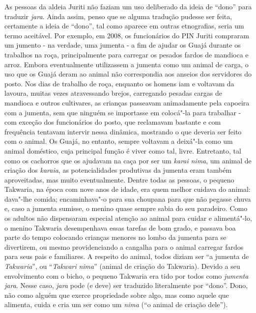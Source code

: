 As pessoas da aldeia Juriti não faziam um uso deliberado da ideia de
``dono'' para traduzir \emph{jara}. Ainda assim, penso que se alguma
tradução pudesse ser feita, certamente a ideia de ``dono'', tal como
aparece em outras etnografias, seria um termo aceitável. Por exemplo, em
2008, os funcionários do PIN Juriti compraram um jumento - na verdade,
uma jumenta - a fim de ajudar os Guajá durante os trabalhos na roça,
principalmente para carregar os pesados fardos de mandioca e arroz.
Embora eventualmente utilizassem a jumenta como um animal de carga, o
uso que os Guajá deram ao animal não correspondia aos anseios dos
servidores do posto. Nos dias de trabalho de roça, enquanto os homens
iam e voltavam da lavoura, muitas vezes atravessando brejos, carregando
pesadas cargas de mandioca e outros cultivares, as crianças passeavam
animadamente pela capoeira com a jumenta, sem que ninguém se importasse
em colocá"-la para trabalhar - com exceção dos funcionários do posto, que
reclamavam bastante e com frequência tentavam intervir nessa dinâmica,
mostrando o que deveria ser feito com o animal. Os Guajá, no entanto,
sempre voltavam a deixá"-la como um animal doméstico, cuja principal
função é viver como tal, livre. Entretanto, tal como os cachorros que os
ajudavam na caça por ser um \emph{karai} \emph{nima}, um animal de
criação dos \emph{karaia}, as potencialidades produtivas da jumenta eram
também aproveitadas, mas muito eventualmente. Dentre todas as pessoas, o
pequeno Takwaria, na época com nove anos de idade, era quem melhor
cuidava do animal: dava"-lhe comida; encaminhava"-o para sua choupana para
que não pegasse chuva e, caso a jumenta sumisse, o menino quase sempre
sabia do seu paradeiro. Como os adultos não dispensaram especial atenção
ao animal para cuidar e alimentá"-lo, o menino Takwaria desempenhava
essas tarefas de bom grado, e passava boa parte do tempo colocando
crianças menores no lombo da jumenta para se divertirem, ou mesmo
providenciando a cangalha para o animal carregar fardos para seus pais e
familiares. A respeito do animal, todos diziam ser ``a jumenta de
\emph{Takwaria}'', ou ``\emph{Takwari} \emph{nima}'' (animal de criação do
Takwaria). Devido a seu envolvimento com o bicho, o pequeno Takwaria era
tido por todos como \emph{jumenta} \emph{jara}. Nesse caso, \emph{jara}
pode (e deve) ser traduzido literalmente por ``dono''. Dono, não como
alguém que exerce propriedade sobre algo, mas como aquele que alimenta,
cuida e cria um ser como um \emph{nima} (``o animal de criação dele'').

